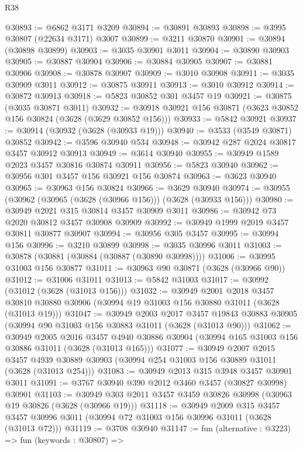 \begin{lexlean}{R38}
\begin{coremodule}
@30893 := @6862 @3171 @3209
@30894 := @30891 @30893
@30898 := @3995 @30807 (@22634 @3171) @3007
@30899 := @3211 @30870
@30901 := @30894 (@30898 @30899)
@30903 := @3035 @30901 @3011
@30904 := @30890 @30903
@30905 := @30887 @30904
@30906 := @30884 @30905
@30907 := @30881 @30906
@30908 := @30878 @30907
@30909 := @3010 @30908
@30911 := @3035 @30909 @3011
@30912 := @30875 @30911
@30913 := @3010 @30912
@30914 := @30872 @30913
@30918 := @5823 @30852 @301 @3457 @19
@30921 := @30875 (@3035 @30871 @3011)
@30932 := @30918 @30921 @156 @30871 (@3623 @30852 @156 @30824 (@3628 (@3629 @30852 @156)))
@30933 := @5842 @30921
@30937 := @30914 (@30932 (@3628 (@30933 @19)))
@30940 := @3533 (@3549 @30871) @30852
@30942 := @3596 @30940 @534
@30948 := @30942 @287 @2024 @30817 @3457 @30912 @30913
@30949 := @3614 @30940
@30955 := @30949 @1589 @2023 @3457 @30816 @30874 @30911
@30956 := @5823 @30940
@30962 := @30956 @301 @3457 @156 @30921 @156 @30874
@30963 := @3623 @30940
@30965 := @30963 @156 @30824
@30966 := @3629 @30940
@30974 := @30955 (@30962 (@30965 (@3628 (@30966 @156))) (@3628 (@30933 @156)))
@30980 := @30949 @2021 @315 @30814 @3457 @30909 @3011
@30986 := @30942 @73 @2020 @30812 @3457 @30908 @30909
@30992 := @30949 @1999 @2019 @3457 @30811 @30877 @30907
@30994 := @30956 @305 @3457
@30995 := @30994 @156
@30996 := @3210 @30899
@30998 := @3035 @30996 @3011
@31003 := @30878 (@30881 (@30884 (@30887 (@30890 @30998))))
@31006 := @30995 @31003 @156 @30877
@31011 := @30963 @90 @30871 (@3628 (@30966 @90))
@31012 := @31006 @31011
@31013 := @5842 @31003
@31017 := @30992 (@31012 (@3628 (@31013 @156)))
@31032 := @30949
    @2001
    @2018
    @3457
    @30810
    @30880
    @30906
    (@30994 @19 @31003 @156 @30880 @31011 (@3628 (@31013 @19)))
@31047 := @30949
    @2003
    @2017
    @3457
    @19843
    @30883
    @30905
    (@30994 @90 @31003 @156 @30883 @31011 (@3628 (@31013 @90)))
@31062 := @30949
    @2005
    @2016
    @3457
    @4940
    @30886
    @30904
    (@30994 @165 @31003 @156 @30886 @31011 (@3628 (@31013 @165)))
@31077 := @30949
    @2007
    @2015
    @3457
    @4939
    @30889
    @30903
    (@30994 @254 @31003 @156 @30889 @31011 (@3628 (@31013 @254)))
@31083 := @30949 @2013 @315 @3948 @3457 @30901 @3011
@31091 := @3767 @30940 @390 @2012 @3460 @3457 (@30827 @30998) @30901
@31103 := @30949 @303 @2011 @3457 @3459 @30826 @30998 (@30963 @19 @30826 (@3628 (@30966 @19)))
@31118 := @30949
    @2009
    @315
    @3457
    @3457
    @30996
    @3011
    (@30994 @72 @31003 @156 @30996 @31011 (@3628 (@31013 @72)))
@31119 := @3708 @30940
@31147 := fun (alternative : @3223) =>
  fun (keywords : @30807) =>

\end{coremodule}
\end{lexlean}
